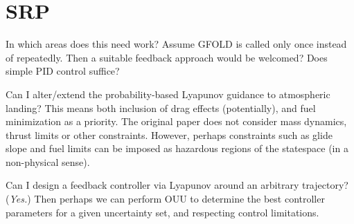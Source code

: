 \documentclass[10pt,a4paper]{article}
\begin{document}
	
	
	\section{SRP}
	In which areas does this need work? Assume GFOLD is called only once instead of repeatedly. Then a suitable feedback approach would be welcomed? Does simple PID control suffice?
	 
	Can I alter/extend the probability-based Lyapunov guidance to atmospheric landing? This means both inclusion of drag effects (potentially), and fuel minimization as a priority. The original paper does not consider mass dynamics, thrust limits or other constraints. However, perhaps constraints such as glide slope and fuel limits can be imposed as hazardous regions of the statespace (in a non-physical sense).
	
	Can I design a feedback controller via Lyapunov around an arbitrary trajectory? (\textit{Yes.}) Then perhaps we can perform OUU to determine the best controller parameters for a given uncertainty set, and respecting control limitations.
	
\end{document}
